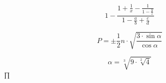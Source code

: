 \documentclass[a4paper,twoside,10 pt]{article}
\begin{document}
\begin{normalsize}
    $$1-\frac{1+\frac{1}{x}-\frac{1}{1-\frac{y}{z}}}{1-\frac{a}{b}+\frac{c}{d}}$$

    $$P=\pm \frac{1}{2} n\cdot\sqrt{\frac{3\cdot\sin \alpha}{\cos \alpha}}$$

    $$\alpha = \sqrt[3]{9\cdot\sqrt[2]{4}}$$∏
\end{normalsize}
\end{document}
